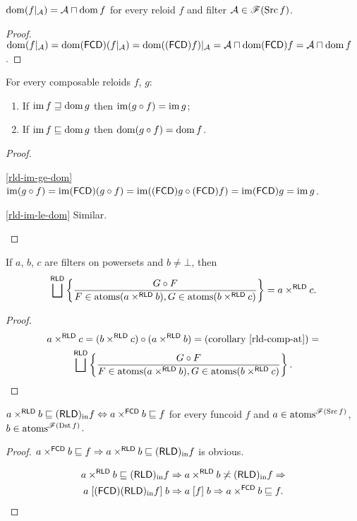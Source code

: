 \begin{prop}
$\operatorname{dom}(f|_{\mathcal{A}})=\mathcal{A}\sqcap\operatorname{dom} f$ for every reloid
$f$ and filter $\mathcal{A}\in\mathscr{F}(\operatorname{Src} f)$.\end{prop}
\begin{proof}
$\operatorname{dom}(f|_{\mathcal{A}})=\operatorname{dom}(\mathsf{FCD})(f|_{\mathcal{A}})=\operatorname{dom}((\mathsf{FCD}) f)|_{\mathcal{A}}=\mathcal{A}\sqcap\operatorname{dom}(\mathsf{FCD}) f=\mathcal{A}\sqcap\operatorname{dom} f$.\end{proof}
\begin{thm}
For every composable reloids $f$, $g$:
\begin{enumerate}
\item \label{rld-im-ge-dom}If $\operatorname{im} f\sqsupseteq\operatorname{dom} g$ then $\operatorname{im}(g\circ f)=\operatorname{im} g$;
\item \label{rld-im-le-dom}If $\operatorname{im} f\sqsubseteq\operatorname{dom} g$ then $\operatorname{dom}(g\circ f)=\operatorname{dom} f$.
\end{enumerate}
\end{thm}
\begin{proof}
~
\begin{widedisorder}
\item [{\ref{rld-im-ge-dom}}] $\operatorname{im}(g\circ f)=\operatorname{im}(\mathsf{FCD})(g\circ f)=\operatorname{im}((\mathsf{FCD}) g\circ(\mathsf{FCD}) f)=\operatorname{im}(\mathsf{FCD}) g=\operatorname{im} g$.
\item [{\ref{rld-im-le-dom}}] Similar.
\end{widedisorder}
\end{proof}
\begin{lem}
If $a$, $b$, $c$ are filters on powersets and $b\neq\bot$, then
\[
\bigsqcup^{\mathsf{RLD}}\setcond{G\circ F}{F\in\atoms(a\times^{\mathsf{RLD}}b),G\in\atoms(b\times^{\mathsf{RLD}}c)}=a\times^{\mathsf{RLD}}c.
\]
\end{lem}
\begin{proof}
~
\begin{multline*}
a\times^{\mathsf{RLD}}c=(b\times^{\mathsf{RLD}}c)\circ(a\times^{\mathsf{RLD}}b)=\text{(corollary \ref{rld-comp-at})}=\\
\bigsqcup^{\mathsf{RLD}}\setcond{G\circ F}{F\in\atoms(a\times^{\mathsf{RLD}}b),G\in\atoms(b\times^{\mathsf{RLD}}c)}.
\end{multline*}
\end{proof}
\begin{thm}
$a\times^{\mathsf{RLD}}b\sqsubseteq(\mathsf{RLD})_{\mathrm{in}} f\Leftrightarrow a\times^{\mathsf{FCD}}b\sqsubseteq f$
for every funcoid $f$ and $a\in\operatorname{atoms}^{\mathscr{F}(\operatorname{Src} f)}$, $b\in\operatorname{atoms}^{\mathscr{F}(\operatorname{Dst} f)}$.\end{thm}
\begin{proof}
$a\times^{\mathsf{FCD}}b\sqsubseteq f\Rightarrow a\times^{\mathsf{RLD}}b\sqsubseteq(\mathsf{RLD})_{\mathrm{in}} f$
is obvious.

\begin{multline*}
a\times^{\mathsf{RLD}}b\sqsubseteq(\mathsf{RLD})_{\mathrm{in}} f\Rightarrow a\times^{\mathsf{RLD}}b\not\asymp(\mathsf{RLD})_{\mathrm{in}} f\Rightarrow\\
a\mathrel{\left[(\mathsf{FCD})(\mathsf{RLD})_{\mathrm{in}} f\right]}b\Rightarrow a\mathrel{\left[f\right]}b\Rightarrow a\times^{\mathsf{FCD}}b\sqsubseteq f.
\end{multline*}
\end{proof}
